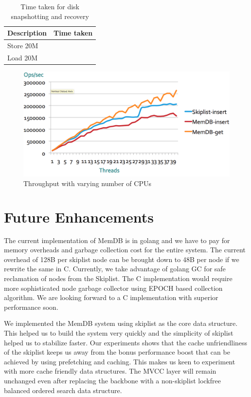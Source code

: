 \documentclass{vldb}
\begin{document}
\begin{table}[h]
\caption{Time taken for disk snapshotting and recovery}
\begin{tabularx}{\linewidth}{|X|l|} \hline
Description&Time taken\\ \hline
Store 20M &\\ \hline
Load 20M &\\ \hline
\hline\end{tabularx}
\end{table}



\begin{figure}[h]
\includegraphics[scale=0.28]{images/fig-7}
\caption{Throughput with varying number of CPUs}
\label{fig:throughput-threads}
\end{figure}



\section{Future Enhancements}
The current implementation of MemDB is in golang and we have to pay for memory overheads and garbage collection cost for the entire system. The current overhead of 128B per skiplist node can be brought down to 48B per node if we rewrite the same in C. Currently, we take advantage of golang GC for safe reclamation of nodes from the Skiplist. The C implementation would require more sophisticated node garbage collector using EPOCH based collection algorithm. We are looking forward to a C implementation with superior performance soon.

    We implemented the MemDB system using skiplist as the core data structure. This helped us to build the system very quickly and the simplicity of skiplist helped us to stabilize faster. Our experiments shows that the cache unfriendliness of the skiplist keeps us away from the bonus performance boost that can be achieved by using prefetching and caching. This makes us keen to experiment with more cache friendly data structures. The MVCC layer will remain unchanged even after replacing the backbone with a non-skiplist lockfree balanced ordered search data structure.


\end{document}
